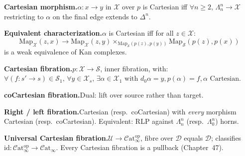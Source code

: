 \begin{formalrestatement}
\textbf{Cartesian morphism.}\quad $\alpha : x \to y$ in $\mathcal{X}$
over $p$ is Cartesian iff $\forall n \geq 2$, $\Lambda^n_n \to \mathcal{X}$
restricting to $\alpha$ on the final edge extends to $\Delta^n$.

\medskip
\textbf{Equivalent characterization.}\quad $\alpha$ is Cartesian iff for
all $z \in \mathcal{X}$:
\begin{equation*}
  \mathrm{Map}_\mathcal{X}(z, x) \to \mathrm{Map}_\mathcal{X}(z, y) \times_{\mathrm{Map}_\mathcal{S}(p(z), p(y))} \mathrm{Map}_\mathcal{S}(p(z), p(x))
\end{equation*}
is a weak equivalence of Kan complexes.

\medskip
\textbf{Cartesian fibration.}\quad $p : \mathcal{X} \to \mathcal{S}$,
inner fibration, with: $\forall (f : s' \to s) \in \mathcal{S}_1, \, \forall y
\in \mathcal{X}_s, \, \exists \alpha \in \mathcal{X}_1 \text{ with } d_0 \alpha = y,
p(\alpha) = f, \alpha \text{ Cartesian}$.

\medskip
\textbf{coCartesian fibration.}\quad Dual: lift over source rather than target.

\medskip
\textbf{Right / left fibration.}\quad Cartesian (resp.\ coCartesian) with
\emph{every} morphism Cartesian (resp.\ coCartesian). Equivalent: RLP
against $\Lambda^n_n$ (resp.\ $\Lambda^n_0$) horns.

\medskip
\textbf{Universal Cartesian fibration.}\quad $\mathcal{U} \to
\mathcal{C}\mathrm{at}_\infty^{\mathrm{op}}$, fibre over $\mathcal{D}$
equals $\mathcal{D}$; classifies $\mathrm{id} :
\mathcal{C}\mathrm{at}_\infty^{\mathrm{op}} \to \mathcal{C}\mathrm{at}_\infty$.
Every Cartesian fibration is a pullback (Chapter~47).
\end{formalrestatement}
